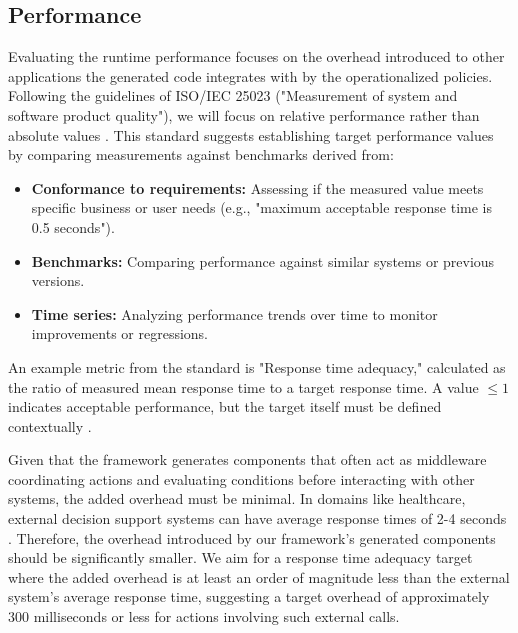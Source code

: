 \subsection{Performance}

Evaluating the runtime performance focuses on the overhead introduced to other applications the generated code integrates with by the operationalized policies. Following the guidelines of ISO/IEC 25023 ("Measurement of system and software product quality"), we will focus on relative performance rather than absolute values \cite{ISO_25023}. This standard suggests establishing target performance values by comparing measurements against benchmarks derived from:
\begin{itemize}
    \item \textbf{Conformance to requirements:} Assessing if the measured value meets specific business or user needs (e.g., "maximum acceptable response time is 0.5 seconds").
    \item \textbf{Benchmarks:} Comparing performance against similar systems or previous versions.
    \item \textbf{Time series:} Analyzing performance trends over time to monitor improvements or regressions.
\end{itemize}
An example metric from the standard is "Response time adequacy," calculated as the ratio of measured mean response time to a target response time. A value $\leq 1$ indicates acceptable performance, but the target itself must be defined contextually \cite{ISO_25023}.

Given that the framework generates components that often act as middleware coordinating actions and evaluating conditions before interacting with other systems, the added overhead must be minimal. In domains like healthcare, external decision support systems can have average response times of 2-4 seconds \cite{ResponseTimeNDSC}. Therefore, the overhead introduced by our framework's generated components should be significantly smaller. We aim for a response time adequacy target where the added overhead is at least an order of magnitude less than the external system's average response time, suggesting a target overhead of approximately 300 milliseconds or less for actions involving such external calls.
